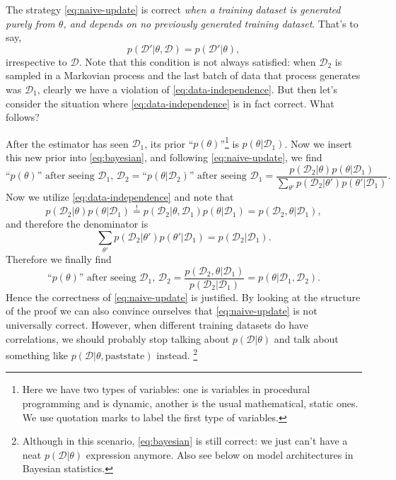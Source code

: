 \documentclass[hyperref, a4paper]{article}
\begin{document}
The strategy \eqref{eq:naive-update} is correct \emph{when a training dataset is generated purely from $\theta$,
and depends on no previously generated training dataset}.
That's to say,
\begin{equation}
    p(\mathcal{D}' | \theta, \mathcal{D}) = p(\mathcal{D}' | \theta),
    \label{eq:data-independence}
\end{equation}
irrespective to $\mathcal{D}$.
Note that this condition is not always satisfied:
when $\mathcal{D}_2$ is sampled in a Markovian process and the last batch of data that process generates was $\mathcal{D}_1$,
clearly we have a violation of \eqref{eq:data-independence}.
But then let's consider the situation where \eqref{eq:data-independence} is in fact correct. What follows?

After the estimator has seen $\mathcal{D}_1$,
its prior ``$p(\theta)$''\footnote{Here we have two types of variables: one is variables in procedural programming and is dynamic,
another is the usual mathematical, static ones.
We use quotation marks to label the first type of variables.}
is $p(\theta | \mathcal{D}_1)$.
Now we insert this new prior into \eqref{eq:bayesian},
and following \eqref{eq:naive-update}, we find 
\begin{equation}
    \text{``$p(\theta)$'' after seeing $\mathcal{D}_1$, $\mathcal{D}_2$} = 
    \text{``$p(\theta | \mathcal{D}_2)$'' after seeing $\mathcal{D}_1$} = 
    \frac{
        p(\mathcal{D}_2 | \theta) p(\theta | \mathcal{D}_1)
    }{
        \sum_{\theta'} p(\mathcal{D}_2 | \theta') p(\theta' | \mathcal{D}_1)
    }.
    \label{eq:two-step-update}
\end{equation}
Now we utilize \eqref{eq:data-independence} and note that 
\[
    p(\mathcal{D}_2 | \theta) p(\theta | \mathcal{D}_1) \stackrel{!}{=} p(\mathcal{D}_2 | \theta, \mathcal{D}_1) p(\theta | \mathcal{D}_1)
    = p(\mathcal{D}_2, \theta | \mathcal{D}_1),
\]
and therefore the denominator is 
\[
    \sum_{\theta'} p(\mathcal{D}_2 | \theta') p(\theta' | \mathcal{D}_1) = p (\mathcal{D}_2 | \mathcal{D}_1).
\]
Therefore we finally find 
\begin{equation}
    \text{``$p(\theta)$'' after seeing $\mathcal{D}_1$, $\mathcal{D}_2$} = \frac{p(\mathcal{D}_2, \theta | \mathcal{D}_1)}{p (\mathcal{D}_2 | \mathcal{D}_1)} = p(\theta | \mathcal{D}_1, \mathcal{D}_2).
\end{equation}
Hence the correctness of \eqref{eq:naive-update} is justified.
By looking at the structure of the proof we can also convince ourselves that \eqref{eq:naive-update} is not universally correct.
However, when different training datasets do have correlations,
we should probably stop talking about $p(\mathcal{D} | \theta)$
and talk about something like $p(\mathcal{D} | \theta, \mathrm{past state})$ instead.%
\footnote{
    Although in this scenario, \eqref{eq:bayesian} is still correct:
    we just can't have a neat $p(\mathcal{D} | \theta)$ expression anymore.
    Also see below on model architectures in Bayesian statistics.
}
\end{document}
